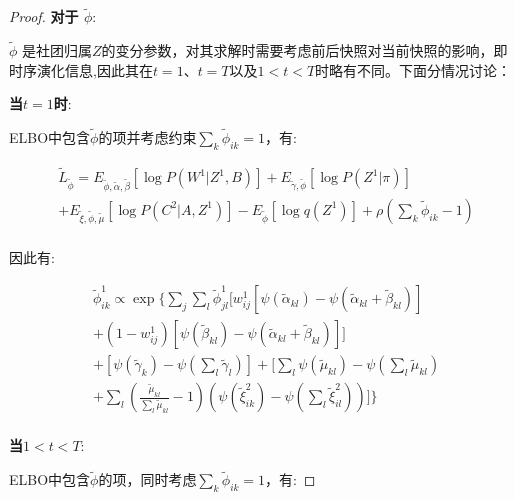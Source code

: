 \begin{proof}
	\textbf{对于 $\widetilde{\phi}$}:
	
	$\widetilde{\phi}$ 是社团归属$Z$的变分参数，对其求解时需要考虑前后快照对当前快照的影响，即时序演化信息,因此其在$t=1$、$t=T$以及$1<t<T$时略有不同。下面分情况讨论：
	
	\textbf{当$t=1$时}:
	
	ELBO中包含$\widetilde{\phi}$的项并考虑约束$\sum_k \widetilde{\phi}_{ik} = 1$，有:
	
	\begin{equation}
		\begin{split}
			&\widetilde{L}_{\widetilde{\phi}} = E_{\widetilde{\phi},\widetilde{\alpha},\widetilde{\beta}} [\log P(W^1|Z^1,B)] + E_{\widetilde{\gamma},\widetilde{\phi}}[\log P(Z^1|\pi)] \\
			&+ E_{\widetilde{\xi},\widetilde{\phi},\widetilde{\mu}}[\log P(C^2|A,Z^1)] - E_{\widetilde{\phi}}[\log q(Z^1)]+\rho (\sum_k \widetilde{\phi}_{ik}-1)\\
		\end{split}
	\end{equation}
	
	因此有:
	
	\begin{equation}
		\label{appendix:eq8}
		\begin{split}
			&\widetilde{\phi}_{ik}^1 \propto \exp\{\sum_j \sum_l \widetilde{\phi}_{jl}^1 [w_{ij}^1[\psi(\widetilde{\alpha}_{kl})-\psi(\widetilde{\alpha}_{kl}+\widetilde{\beta}_{kl})] \\
			&+ (1-w_{ij}^1)[\psi(\widetilde{\beta}_{kl}) - \psi(\widetilde{\alpha}_{kl}+\widetilde{\beta}_{kl})] ]   \\
			& +[\psi(\widetilde{\gamma}_k)-\psi(\sum_l \widetilde{\gamma}_l) ] +[\sum_l \psi(\widetilde{\mu}_{kl}) - \psi(\sum_l \widetilde{\mu}_{kl}) \\
		&	+ \sum_l (\frac{\widetilde{\mu}_{kl}}{\sum_l \widetilde{\mu}_{kl}}-1)(\psi (\widetilde{\xi}_{ik}^2) - \psi(\sum_l \widetilde{\xi}_{il}^2))]  \} \\
		\end{split}
	\end{equation}
	
	\textbf{当$1<t<T$}:
	
	ELBO中包含$\widetilde{\phi}$的项，同时考虑$\sum_k \widetilde{\phi}_{ik} = 1 $，有:
	

\end{proof}
